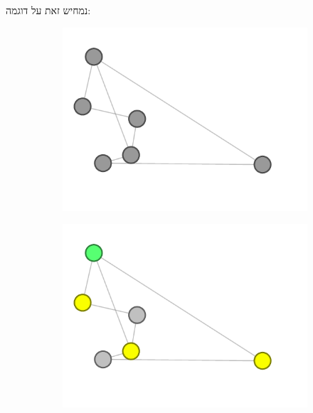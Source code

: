 \documentclass[12pt,twoside]{article}
\begin{document}
נמחיש זאת על דוגמה:
\begin{figure}[h]
    \begin{subfigure}{.5\textwidth}
        \unsethebrew
        \caption{}
        \centering
        \includegraphics[width=\textwidth,height=\textheight,keepaspectratio]{images/graph_start_board.png}
        \sethebrew
    \end{subfigure}%
    \begin{subfigure}{.5\textwidth}
        \unsethebrew
        \caption{}
        \centering
        \includegraphics[width=\textwidth,height=\textheight,keepaspectratio]{images/graph_press.png}
        \sethebrew
    \end{subfigure}%
\end{figure}
\end{document}
